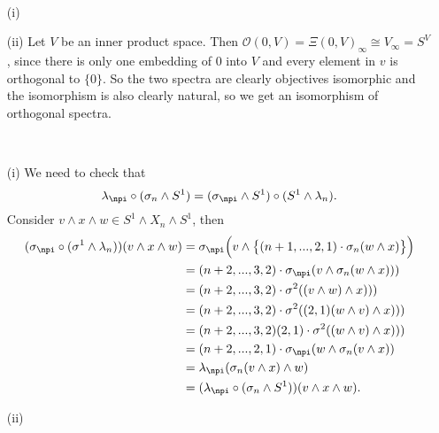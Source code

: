 
\def \L{\mathbb{L}}
\def \O{\mathcal{O}}


\mmaketitle

\begin{exercise}[1]\ 
\begin{enumerate}
\item[(i)]

\item[(ii)]
Let $V$ be an inner product space. Then $\O(0, V) = \Xi(0,V)_\infty \cong
V_\infty = S^V$,
since there is only one embedding of $0$ into $V$ and every element in $v$ is
orthogonal to $\{0\}$. So the two spectra are clearly objectives isomorphic and
the isomorphism is also clearly natural, so we get an isomorphism of orthogonal
spectra.
\end{enumerate}

\end{exercise}

\begin{exercise}[2]\ 
\begin{enumerate}
\item[(i)]
We need to check that 
\[ \lambda_\npi \circ (\sigma_n \wedge S^1) = (\sigma_\npi \wedge S^1) \circ
(S^1 \wedge \lambda_n). \]
Consider $v \wedge x \wedge w \in S^1 \wedge X_n \wedge S^1$, then
\begin{align*}
(\sigma_\npi \circ (\sigma^1 \wedge \lambda_n))(v \wedge x \wedge w) 
&= \sigma_\npi\Big(v \wedge \big\{ (n+1,...,2,1)\cdot\sigma_n(w \wedge x)\big\}\Big) \\
&= (n+2,...,3,2)\cdot\sigma_\npi(v \wedge \sigma_n(w\wedge x))) \\
&= (n+2,...,3,2) \cdot \sigma^2( (v \wedge w) \wedge x))) \\
&= (n+2,...,3,2) \cdot \sigma^2( (2,1) (w \wedge v) \wedge x))) \\
&= (n+2,...,3,2)(2,1) \cdot \sigma^2( (w \wedge v) \wedge x))) \\
&= (n+2,...,2,1) \cdot \sigma_\npi( w \wedge \sigma_n(v \wedge x)) \\
&= \lambda_\npi( \sigma_n(v \wedge x) \wedge w) \\
&= (\lambda_\npi \circ (\sigma_n \wedge S^1))(v \wedge x \wedge w).
\end{align*}

\item[(ii)]
\end{enumerate}
\end{exercise}

